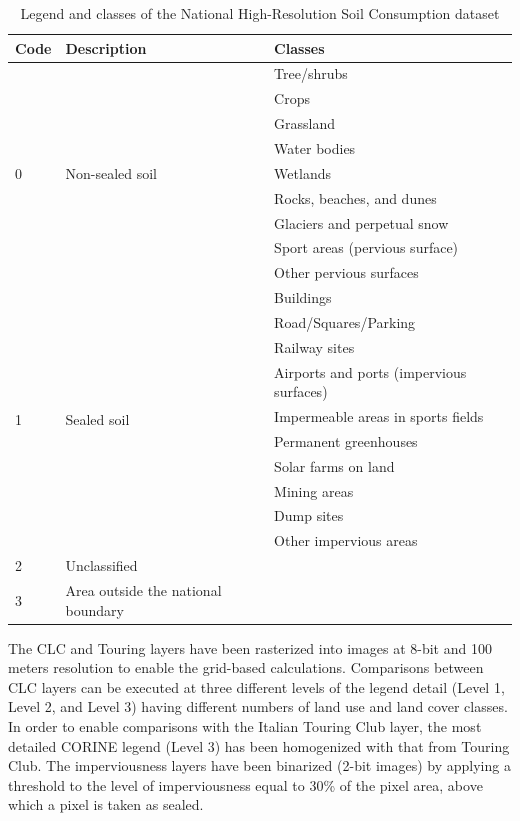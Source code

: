 \documentclass[APA,LATO1COL,doublespace]{WileyNJD-v2}
\begin{document}
\begin{table}
\caption{Legend and classes of the National High-Resolution Soil Consumption dataset}\label{tab:IMPclasses}
\centering
\begin{tabular}[t]{ l l | l } 
\hline
\textbf{Code} & \textbf{Description} & \textbf{Classes} \\
\hline
\multirow{9}{4em}{0} & \multirow{9}{10em}{Non-sealed soil} & Tree/shrubs \\ 
 &  & Crops \\ 
 &  & Grassland \\ 
 &  & Water bodies \\ 
 &  & Wetlands \\ 
 &  & Rocks, beaches, and dunes \\ 
 &  & Glaciers and perpetual snow \\ 
 &  & Sport areas (pervious surface) \\ 
 &  & Other pervious surfaces \\ 
\hline
\multirow{10}{4em}{1} & \multirow{10}{10em}{Sealed soil} & Buildings \\ 
 &  & Road/Squares/Parking \\ 
 &  & Railway sites \\ 
 &  & Airports and ports (impervious surfaces) \\ 
 &  & Impermeable areas in sports fields \\ 
 &  & Permanent greenhouses \\ 
 &  & Solar farms on land \\ 
 &  & Mining areas \\ 
 &  & Dump sites \\ 
 &  & Other impervious areas \\
\hline
2 & Unclassified & \\
\hline
3 & Area outside the national boundary & \\
\hline
\end{tabular}
\end{table}

The CLC and Touring layers have been rasterized into images at 8-bit and 100 meters resolution to enable the grid-based calculations. %
Comparisons between CLC layers can be executed at three different levels of the legend detail (Level 1, Level 2, and Level 3) having different numbers of land use and land cover classes. 
In order to enable comparisons with the Italian Touring Club layer, the most detailed CORINE legend (Level 3) has been homogenized with that from Touring Club. 
The imperviousness layers have been binarized (2-bit images) by applying a threshold to the level of imperviousness equal to 30\% of the pixel area, above which a pixel is taken as sealed.
\end{document}
